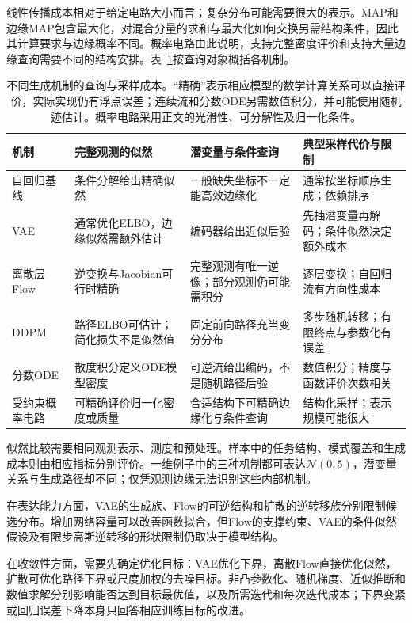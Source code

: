 线性传播成本相对于给定电路大小而言；复杂分布可能需要很大的表示。MAP和边缘MAP包含最大化，对混合分量的求和与最大化如何交换另需结构条件，因此其计算要求与边缘概率不同。概率电路由此说明，支持完整密度评价和支持大量边缘查询需要不同的结构安排。表~\ref{tab:pgm-generative-model-comparison}按查询对象概括各机制。

\begin{table}[htbp]
  \centering
  \small
  \begin{tabularx}{\linewidth}{@{}lXXX@{}}
    \toprule
    机制 & 完整观测的似然 & 潜变量与条件查询 & 典型采样代价与限制 \\
    \midrule
    自回归基线
      & 条件分解给出精确似然
      & 一般缺失坐标不一定能高效边缘化
      & 通常按坐标顺序生成；依赖排序 \\
    VAE
      & 通常优化ELBO，边缘似然需额外估计
      & 编码器给出近似后验
      & 先抽潜变量再解码；条件似然决定额外成本 \\
    离散层Flow
      & 逆变换与Jacobian可行时精确
      & 完整观测有唯一逆像；部分观测仍可能需积分
      & 逐层变换；自回归流有方向性成本 \\
    DDPM
      & 路径ELBO可估计；简化损失不是似然值
      & 固定前向路径充当变分分布
      & 多步随机转移；有限终点与参数化有误差 \\
    分数ODE
      & 散度积分定义ODE模型密度
      & 可逆流给出编码，不是随机路径后验
      & 数值积分；精度与函数评价次数相关 \\
    受约束概率电路
      & 可精确评价归一化密度或质量
      & 合适结构下可精确边缘化与条件查询
      & 结构化采样；表示规模可能很大 \\
    \bottomrule
  \end{tabularx}
  \caption{不同生成机制的查询与采样成本。“精确”表示相应模型的数学计算关系可以直接评价，实际实现仍有浮点误差；连续流和分数ODE另需数值积分，并可能使用随机迹估计。概率电路采用正文的光滑性、可分解性及归一化条件。}
  \label{tab:pgm-generative-model-comparison}
\end{table}

似然比较需要相同观测表示、测度和预处理。样本中的任务结构、模式覆盖和生成成本则由相应指标分别评价。一维例子中的三种机制都可表达$\mathcal{N}(0,5)$，潜变量关系与生成路径却不同；仅凭观测边缘无法识别这些内部机制。

在表达能力方面，VAE的生成族、Flow的可逆结构和扩散的逆转移族分别限制候选分布。增加网络容量可以改善函数拟合，但Flow的支撑约束、VAE的条件似然假设及有限步高斯逆转移的形状限制仍取决于模型结构。

在收敛性方面，需要先确定优化目标：VAE优化下界，离散Flow直接优化似然，扩散可优化路径下界或尺度加权的去噪目标。非凸参数化、随机梯度、近似推断和数值求解分别影响能否达到目标最优值，以及所需迭代和每次迭代成本；下界变紧或回归误差下降本身只回答相应训练目标的改进。

